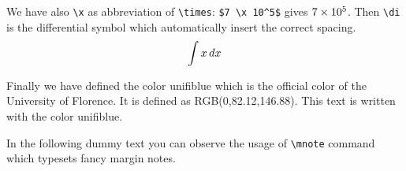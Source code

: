 \documentclass[a4paper,binding=0.6cm]{unifith}
\newcommand{\bs}{\textbackslash}
\begin{document}
We have also \texttt{\bs x} as abbreviation of \texttt{\bs times}: \texttt{\$7 \bs x 10\^{}5\$} gives $7 \times 10^5$. Then \texttt{\bs di} is the differential symbol which automatically insert the correct spacing.
\[
\int x \mathop{}\!d x
\]

Finally we have defined the color \textsf{unifiblue} which is the official color
of the University of Florence. It is defined as RGB(0,82.12,146.88). \textcolor{unifiblue}{This text is written with the color \textsf{unifiblue}.}

In the following dummy text you can observe the usage of \texttt{\bs mnote} command which typesets fancy margin notes.

\textcolor{gray}{\lipsum}
\textcolor{gray}{\lipsum}

\backmatter
\end{document}
